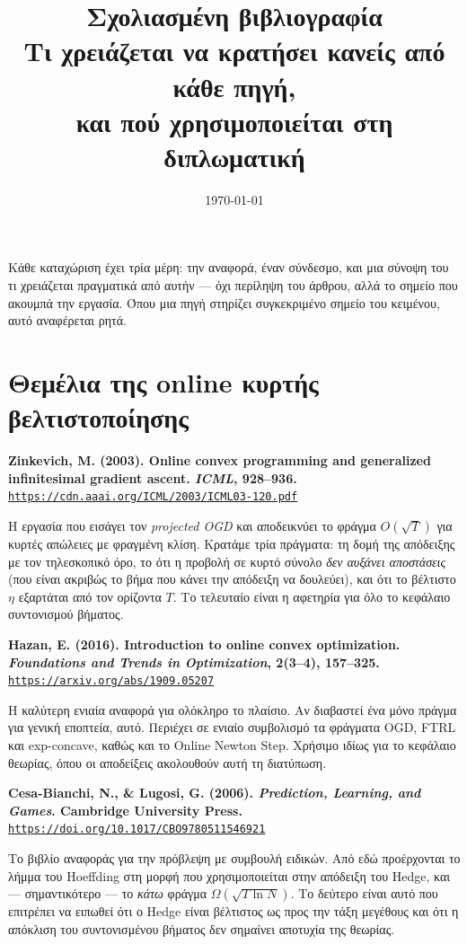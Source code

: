 \documentclass[11pt,a4paper]{article}
\title{\textbf{Σχολιασμένη βιβλιογραφία}\\[6pt]
\large\normalfont Τι χρειάζεται να κρατήσει κανείς από κάθε πηγή,\\
και πού χρησιμοποιείται στη διπλωματική}
\author{}
\date{\today}
\newcommand{\src}[3]{%
  \par\medskip\noindent\textbf{#2}\\
  \href{#3}{\texttt{\small #3}}\par\smallskip}
\begin{document}
\maketitle

\noindent\small
Κάθε καταχώριση έχει τρία μέρη: την αναφορά, έναν σύνδεσμο, και μια σύνοψη του τι χρειάζεται
πραγματικά από αυτήν --- όχι περίληψη του άρθρου, αλλά το σημείο που ακουμπά την εργασία.
Όπου μια πηγή στηρίζει συγκεκριμένο σημείο του κειμένου, αυτό αναφέρεται ρητά.
\normalsize

\section{Θεμέλια της online κυρτής βελτιστοποίησης}

\src{zinkevich2003}{Zinkevich, M. (2003). Online convex programming and generalized
infinitesimal gradient ascent. \emph{ICML}, 928--936.}
{https://cdn.aaai.org/ICML/2003/ICML03-120.pdf}
Η εργασία που εισάγει τον \emph{projected OGD} και αποδεικνύει το φράγμα $O(\sqrt{T})$ για
κυρτές απώλειες με φραγμένη κλίση. Κρατάμε τρία πράγματα: τη δομή της απόδειξης με τον
τηλεσκοπικό όρο, το ότι η προβολή σε κυρτό σύνολο \emph{δεν αυξάνει αποστάσεις} (που είναι
ακριβώς το βήμα που κάνει την απόδειξη να δουλεύει), και ότι το βέλτιστο $\eta$ εξαρτάται από
τον ορίζοντα $T$. Το τελευταίο είναι η αφετηρία για όλο το κεφάλαιο συντονισμού βήματος.

\src{hazan2016}{Hazan, E. (2016). Introduction to online convex optimization.
\emph{Foundations and Trends in Optimization}, 2(3--4), 157--325.}
{https://arxiv.org/abs/1909.05207}
Η καλύτερη ενιαία αναφορά για ολόκληρο το πλαίσιο. Αν διαβαστεί ένα μόνο πράγμα για γενική
εποπτεία, αυτό. Περιέχει σε ενιαίο συμβολισμό τα φράγματα OGD, FTRL και exp-concave, καθώς
και το Online Newton Step. Χρήσιμο ιδίως για το κεφάλαιο θεωρίας, όπου οι αποδείξεις
ακολουθούν αυτή τη διατύπωση.

\src{cesabianchi2006}{Cesa-Bianchi, N., \& Lugosi, G. (2006). \emph{Prediction, Learning, and
Games}. Cambridge University Press.}
{https://doi.org/10.1017/CBO9780511546921}
Το βιβλίο αναφοράς για την πρόβλεψη με συμβουλή ειδικών. Από εδώ προέρχονται το λήμμα του
Hoeffding στη μορφή που χρησιμοποιείται στην απόδειξη του Hedge, και --- σημαντικότερο --- το
\emph{κάτω} φράγμα $\Omega(\sqrt{T\ln N})$. Το δεύτερο είναι αυτό που επιτρέπει να ειπωθεί
ότι ο Hedge είναι βέλτιστος ως προς την τάξη μεγέθους και ότι η απόκλιση του συντονισμένου
βήματος δεν σημαίνει αποτυχία της θεωρίας.
\end{document}
